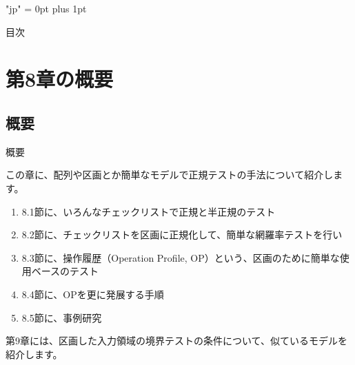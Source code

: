 \author[大阪大学大学院CS専攻\quad{}楊　嘉晨]{修士課程1年生\quad{}楊　嘉晨}
\date{2012年5月29日（火）}


 


\newcommand{\toprule}{\hline}
\newcommand{\midrule}{\hline}
\newcommand{\bottomrule}{\hline}
\newcommand{\itemtitle}[1]{\item \alert{#1} \quad{} }
\newcommand{\upcite}[1]{ }

\XeTeXlinebreaklocale "jp"  
\XeTeXlinebreakskip = 0pt plus 1pt 

\renewcommand{\thefigure}{図~\arabic{figure}} 

\frame{\titlepage} 

\begin{frame}{目次}
\tableofcontents 
\end{frame}



\section{第8章の概要}
\subsection{概要}
\begin{frame}{概要}


この章に、配列や区画とか簡単なモデルで正規テストの手法について紹介します。

\pause

\begin{enumerate}
\item<+-> 8.1節に、いろんなチェックリストで正規と半正規のテスト
\item<+-> 8.2節に、チェックリストを区画に正規化して、簡単な網羅率テストを行い 
\item<+-> 8.3節に、操作履歴（Operation Profile, OP）という、区画のために簡単な使用ベースのテスト
\item<+-> 8.4節に、OPを更に発展する手順
\item<+-> 8.5節に、事例研究 
\end{enumerate}

\pause

第9章には、区画した入力領域の境界テストの条件について、似ているモデルを紹介します。

\end{frame}

